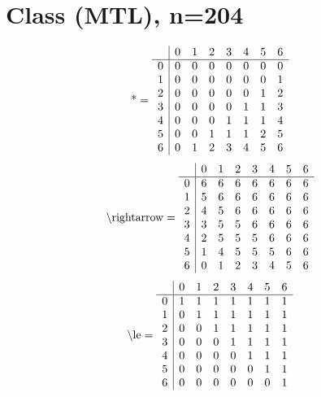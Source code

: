 \documentclass[11pt]{article}
\begin{document}
\section{Class (MTL), n=204}
\[\text{*} = 
\begin{array}{r | r r r r r r r}
 & 0 & 1 & 2 & 3 & 4 & 5 & 6 \\ \hline
0 & 0 & 0 & 0 & 0 & 0 & 0 & 0 \\
1 & 0 & 0 & 0 & 0 & 0 & 0 & 1 \\
2 & 0 & 0 & 0 & 0 & 0 & 1 & 2 \\
3 & 0 & 0 & 0 & 0 & 1 & 1 & 3 \\
4 & 0 & 0 & 0 & 1 & 1 & 1 & 4 \\
5 & 0 & 0 & 1 & 1 & 1 & 2 & 5 \\
6 & 0 & 1 & 2 & 3 & 4 & 5 & 6 \\
\end{array}
\]
\[\text{\textbackslash rightarrow} = 
\begin{array}{r | r r r r r r r}
 & 0 & 1 & 2 & 3 & 4 & 5 & 6 \\ \hline
0 & 6 & 6 & 6 & 6 & 6 & 6 & 6 \\
1 & 5 & 6 & 6 & 6 & 6 & 6 & 6 \\
2 & 4 & 5 & 6 & 6 & 6 & 6 & 6 \\
3 & 3 & 5 & 5 & 6 & 6 & 6 & 6 \\
4 & 2 & 5 & 5 & 5 & 6 & 6 & 6 \\
5 & 1 & 4 & 5 & 5 & 5 & 6 & 6 \\
6 & 0 & 1 & 2 & 3 & 4 & 5 & 6 \\
\end{array}
\]
\[\text{\textbackslash le} = 
\begin{array}{r | r r r r r r r}
 & 0 & 1 & 2 & 3 & 4 & 5 & 6 \\ \hline
0 & 1 & 1 & 1 & 1 & 1 & 1 & 1 \\
1 & 0 & 1 & 1 & 1 & 1 & 1 & 1 \\
2 & 0 & 0 & 1 & 1 & 1 & 1 & 1 \\
3 & 0 & 0 & 0 & 1 & 1 & 1 & 1 \\
4 & 0 & 0 & 0 & 0 & 1 & 1 & 1 \\
5 & 0 & 0 & 0 & 0 & 0 & 1 & 1 \\
6 & 0 & 0 & 0 & 0 & 0 & 0 & 1 \\
\end{array}
\]
\end{document}
